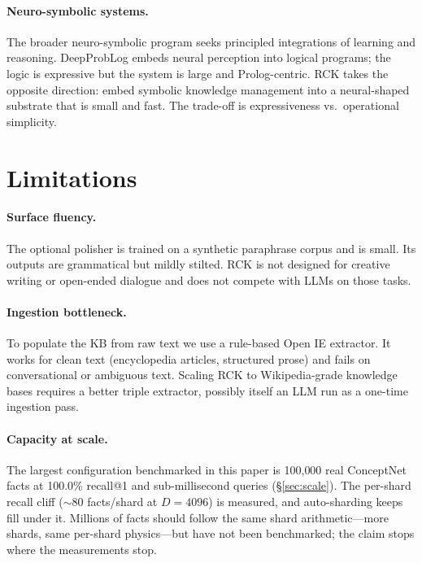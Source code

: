 \documentclass[11pt]{article}
\begin{document}
\paragraph{Neuro-symbolic systems.} The broader neuro-symbolic
program \cite{garcez2019} seeks principled integrations of learning
and reasoning. DeepProbLog \cite{deepproblog2018} embeds neural
perception into logical programs; the logic is expressive but the
system is large and Prolog-centric. RCK takes the opposite
direction: embed symbolic knowledge management into a neural-shaped
substrate that is small and fast. The trade-off is expressiveness
vs.\ operational simplicity.

\section{Limitations}

\paragraph{Surface fluency.} The optional polisher is trained on a
synthetic paraphrase corpus and is small. Its outputs are
grammatical but mildly stilted. RCK is not designed for creative
writing or open-ended dialogue and does not compete with LLMs on
those tasks.

\paragraph{Ingestion bottleneck.} To populate the KB from raw text
we use a rule-based Open IE extractor. It works for clean text
(encyclopedia articles, structured prose) and fails on conversational
or ambiguous text. Scaling RCK to Wikipedia-grade knowledge bases
requires a better triple extractor, possibly itself an LLM run as a
one-time ingestion pass.

\paragraph{Capacity at scale.} The largest configuration
benchmarked in this paper is 100{,}000 real ConceptNet facts at
100.0\% recall@1 and sub-millisecond queries (\S\ref{sec:scale}).
The per-shard recall cliff ($\sim$80 facts/shard at $D=4096$) is
measured, and auto-sharding keeps fill under it. Millions of facts
should follow the same shard arithmetic---more shards, same
per-shard physics---but have not been benchmarked; the claim stops
where the measurements stop.
\end{document}

